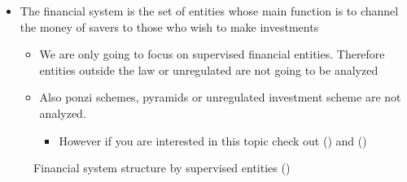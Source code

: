 \documentclass[
  ignorenonframetext,
]{beamer}
\providecommand{\tightlist}{%
  \setlength{\itemsep}{0pt}\setlength{\parskip}{0pt}}\usepackage{longtable,booktabs,array}
\begin{document}
\begin{frame}{}
\label{section-2}
\begin{itemize}
\item
  The financial system is the set of entities whose main function is to
  channel the money of savers to those who wish to make investments

  \begin{itemize}
  \item
    We are only going to focus on supervised financial entities.
    Therefore entities outside the law or unregulated are not going to
    be analyzed
  \item
    Also ponzi schemes, pyramids or unregulated investment scheme are
    not analyzed.

    \begin{itemize}
    \tightlist
    \item
      However if you are interested in this topic check out
      () and
      ()
    \end{itemize}
  \end{itemize}
\end{itemize}
\end{frame}

\begin{frame}{}
\label{section-3}
\begin{figure}


\caption{\label{fig-financial-system-structure-supervised-col}Financial
system structure by supervised entities
()}

\end{figure}%
\end{frame}
\end{document}
